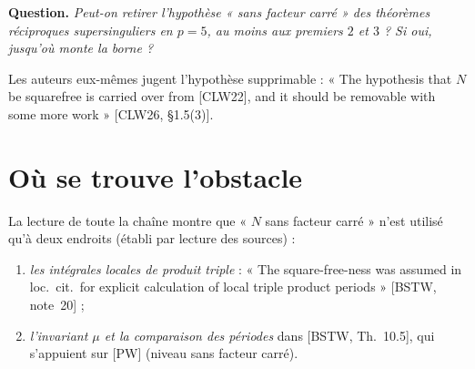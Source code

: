 \documentclass[11pt]{amsart}
\begin{document}
\medskip\noindent\textbf{Question.} \emph{Peut-on retirer l'hypothèse « sans facteur carré » des théorèmes réciproques supersinguliers en $p=5$, au moins aux premiers $2$ et $3$ ? Si oui, jusqu'où monte la borne ?}

Les auteurs eux-mêmes jugent l'hypothèse supprimable : « The hypothesis that $N$ be squarefree is carried over from [CLW22], and it should be removable with some more work » [CLW26, \S1.5(3)].

\section{Où se trouve l'obstacle}
\begin{center}
\end{center}
La lecture de toute la chaîne montre que « $N$ sans facteur carré » n'est utilisé qu'à deux endroits (établi par lecture des sources) :
\begin{enumerate}[label=(\Alph*)]
\item \emph{les intégrales locales de produit triple} : « The square-free-ness was assumed in loc.\ cit.\ for explicit calculation of local triple product periods » [BSTW, note~20] ;
\item \emph{l'invariant $\mu$ et la comparaison des périodes} dans [BSTW, Th.~10.5], qui s'appuient sur [PW] (niveau sans facteur carré).
\end{enumerate}
\end{document}
